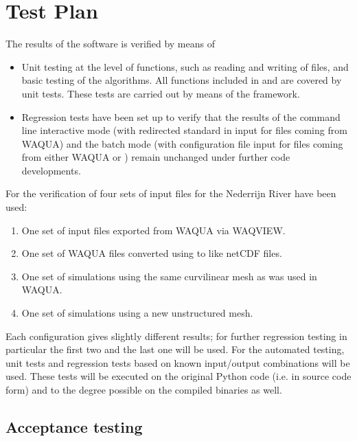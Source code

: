 \chapter{Test Plan} \label{Chp:TestPlan}

The results of the software is verified by means of

\begin{itemize}
\item Unit testing at the level of functions, such as reading and writing of files, and basic testing of the algorithms.
All functions included in  and  are covered by unit tests.
These tests are carried out by means of the  framework.
\item Regression tests have been set up to verify that the results of the command line interactive mode (with redirected standard in input for files coming from WAQUA) and the batch mode (with configuration file input for files coming from either WAQUA or \dflowfm) remain unchanged under further code developments.
\end{itemize}

For the verification of \dfastmi four sets of input files for the Nederrijn River have been used:

\begin{enumerate}
\item One set of input files exported from WAQUA via WAQVIEW.
\item One set of WAQUA files converted using  to \dflowfm like netCDF files.
\item One set of \dflowfm simulations using the same curvilinear mesh as was used in WAQUA.
\item One set of \dflowfm simulations using a new unstructured mesh.
\end{enumerate}

Each configuration gives slightly different results; for further regression testing in particular the first two and the last one will be used.
For the automated testing, unit tests and regression tests based on known input/output combinations will be used.
These tests will be executed on the original Python code (i.e. in source code form) and to the degree possible on the compiled binaries as well.

\section{Acceptance testing}

